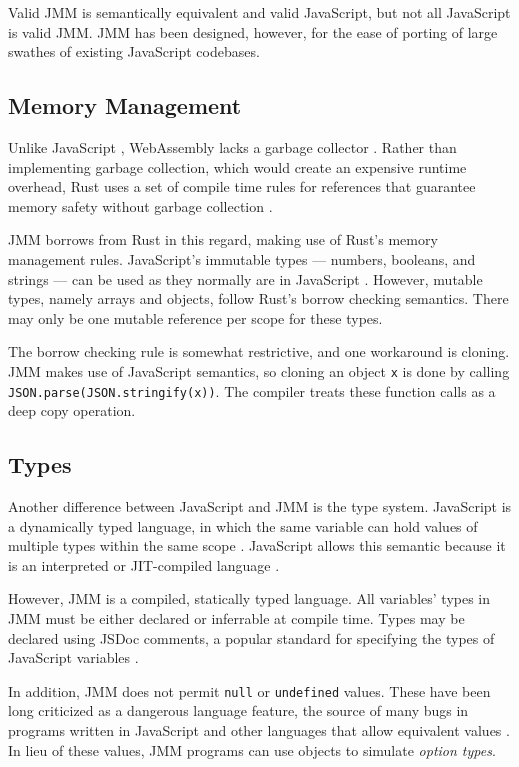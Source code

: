 \documentclass[12pt]{article}
\begin{document}
	Valid JMM is semantically equivalent and valid JavaScript, but not all JavaScript is valid JMM. JMM has been designed, however, for the ease of porting of large swathes of existing JavaScript codebases.
	
	\subsection{Memory Management}
	
	Unlike JavaScript \cite{MDN2017Mem}, WebAssembly lacks a garbage collector \cite{Haas2017}. Rather than implementing garbage collection, which would create an expensive runtime overhead, Rust uses a set of compile time rules for references that guarantee memory safety without garbage collection \cite{Klabnik}.
	
	JMM borrows from Rust in this regard, making use of Rust's memory management rules. JavaScript's immutable types --- numbers, booleans, and strings --- can be used as they normally are in JavaScript \cite{mozilladata}. However, mutable types, namely arrays and objects, follow Rust's borrow checking semantics. There may only be one mutable reference per scope for these types.
	
	The borrow checking rule is somewhat restrictive, and one workaround is cloning. JMM makes use of JavaScript semantics, so cloning an object \texttt{x} is done by calling \texttt{JSON.parse(JSON.stringify(x))}. The compiler treats these function calls as a deep copy operation.
	
	\subsection{Types}
	
	Another difference between JavaScript and JMM is the type system. JavaScript is a dynamically typed language, in which the same variable can hold values of multiple types within the same scope \cite{mozilladata}. JavaScript allows this semantic because it is an interpreted or JIT-compiled language \cite{mozilladata}.
	
	However, JMM is a compiled, statically typed language. All variables' types in JMM must be either declared or inferrable at compile time. Types may be declared using JSDoc comments, a popular standard for specifying the types of JavaScript variables \cite{jsdoc}.
	
	In addition, JMM does not permit \texttt{null} or \texttt{undefined} values. These have been long criticized as a dangerous language feature, the source of many bugs in programs written in JavaScript and other languages that allow equivalent values \cite{hoare2009null}\cite{Klabnik}. In lieu of these values, JMM programs can use objects to simulate \textit{option types}.
	
\end{document}
